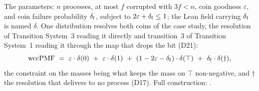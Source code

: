 \begin{definition}
  \label{def:aba-parameters}
  \leanok
  The parameters: $n$ processes, at most $f$ corrupted with $3f < n$, coin goodness $\varepsilon$, and coin failure probability $\delta_{\mathrm{f}}$, subject to $2\varepsilon + \delta_{\mathrm{f}} \le 1$; the Lean field carrying $\delta_{\mathrm{f}}$ is named $\delta$.
  One distribution resolves both coins of the case study, the resolution  of Transition System~3 reading it directly and transition~3 of Transition System~1 reading it through the map that drops the bit (D21):
  \[
    \mathrm{wccPMF} \ =\ \varepsilon \cdot \delta(0) \ +\
      \varepsilon \cdot \delta(1) \ +\
      (1 - 2\varepsilon - \delta_{\mathrm{f}}) \cdot \delta(\top) \ +\
      \delta_{\mathrm{f}} \cdot \delta(\dagger),
  \]
  the constraint on the masses being what keeps the mass on $\top$ non-negative, and $\dagger$ the resolution that delivers to no process (D17).
  Full construction: .
\end{definition}
